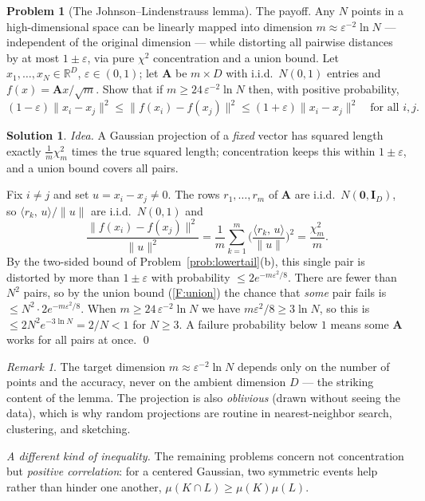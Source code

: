 \documentclass[14pt]{extarticle}
\theoremstyle{definition}
\newtheorem{exercise}{Problem}
\newtheorem*{solution}{Solution}
\theoremstyle{remark}
\newtheorem*{remark}{Remark}
\newcommand{\Real}{\mathbb{R}}
\newcommand{\bA}{\mathbf{A}}
\newcommand{\bI}{\mathbf{I}}
\newcommand{\bzero}{\mathbf{0}}
\newcommand{\ip}[2]{\langle #1,\, #2 \rangle}
\newcommand{\norm}[1]{\lVert #1 \rVert}
\begin{document}
\begin{exercise}[The Johnson--Lindenstrauss lemma]\label{prob:jl}
The payoff. Any $N$ points in a high-dimensional space can be linearly mapped into dimension $m\approx\varepsilon^{-2}\ln N$ --- independent of the original dimension --- while distorting all pairwise distances by at most $1\pm\varepsilon$, via pure $\chi^2$ concentration and a union bound. Let $x_1,\ldots,x_N\in\Real^D$, $\varepsilon\in(0,1)$; let $\bA$ be $m\times D$ with i.i.d.\ $N(0,1)$ entries and $f(x)=\bA x/\sqrt m$. Show that if $m\ge24\,\varepsilon^{-2}\ln N$ then, with positive probability,
\[
(1-\varepsilon)\norm{x_i-x_j}^2\le\norm{f(x_i)-f(x_j)}^2\le(1+\varepsilon)\norm{x_i-x_j}^2\quad\text{for all }i,j.
\]
\end{exercise}
\begin{solution}
\emph{Idea.} A Gaussian projection of a \emph{fixed} vector has squared length exactly $\tfrac1m\chi^2_m$ times the true squared length; concentration keeps this within $1\pm\varepsilon$, and a union bound covers all pairs.

Fix $i\neq j$ and set $u=x_i-x_j\neq0$. The rows $r_1,\ldots,r_m$ of $\bA$ are i.i.d.\ $N(\bzero,\bI_D)$, so $\ip{r_k}{u}/\norm u$ are i.i.d.\ $N(0,1)$ and
\[
\frac{\norm{f(x_i)-f(x_j)}^2}{\norm u^2}=\frac1m\sum_{k=1}^m\Big(\frac{\ip{r_k}{u}}{\norm u}\Big)^2=\frac{\chi^2_m}{m}.
\]
By the two-sided bound of Problem~\ref{prob:lowertail}(b), this single pair is distorted by more than $1\pm\varepsilon$ with probability $\le2e^{-m\varepsilon^2/8}$. There are fewer than $N^2$ pairs, so by the union bound (\ref{F:union}) the chance that \emph{some} pair fails is $\le N^2\cdot2e^{-m\varepsilon^2/8}$. When $m\ge24\,\varepsilon^{-2}\ln N$ we have $m\varepsilon^2/8\ge3\ln N$, so this is $\le2N^2e^{-3\ln N}=2/N<1$ for $N\ge3$. A failure probability below $1$ means some $\bA$ works for all pairs at once. \qed
\end{solution}
\begin{remark}
The target dimension $m\approx\varepsilon^{-2}\ln N$ depends only on the number of points and the accuracy, never on the ambient dimension $D$ --- the striking content of the lemma. The projection is also \emph{oblivious} (drawn without seeing the data), which is why random projections are routine in nearest-neighbor search, clustering, and sketching.
\end{remark}

\noindent\emph{A different kind of inequality.}\; The remaining problems concern not concentration but \emph{positive correlation}: for a centered Gaussian, two symmetric events help rather than hinder one another, $\mu(K\cap L)\ge\mu(K)\mu(L)$.
\end{document}
